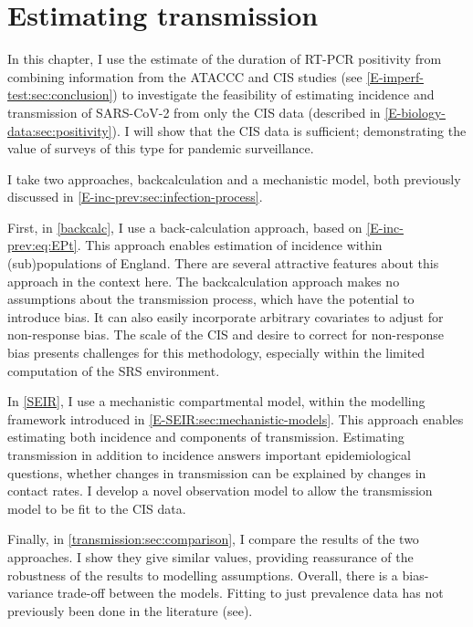 \documentclass[thesis.tex]{subfiles}
\begin{document}
\ifSubfilesClassLoaded{
    \setcounter{chapter}{6}
}

\chapter{Estimating transmission} \label{transmission}

In this chapter, I use the estimate of the duration of RT-PCR positivity from combining information from the ATACCC and CIS studies (see \cref{E-imperf-test:sec:conclusion}) to investigate the feasibility of estimating incidence and transmission of SARS-CoV-2 from only the CIS data (described in \cref{E-biology-data:sec:positivity}).
I will show that the CIS data is sufficient; demonstrating the value of surveys of this type for pandemic surveillance.

I take two approaches, backcalculation and a mechanistic model, both previously discussed in \cref{E-inc-prev:sec:infection-process}.

First, in \cref{backcalc}, I use a back-calculation approach, based on \cref{E-inc-prev:eq:EPt}.
This approach enables estimation of incidence within (sub)populations of England.
There are several attractive features about this approach in the context here.
The backcalculation approach makes no assumptions about the transmission process, which have the potential to introduce bias.
It can also easily incorporate arbitrary covariates to adjust for non-response bias.
The scale of the CIS and desire to correct for non-response bias presents challenges for this methodology, especially within the limited computation of the SRS environment.

In \cref{SEIR}, I use a mechanistic compartmental model, within the modelling framework introduced in \cref{E-SEIR:sec:mechanistic-models}.
This approach enables estimating both incidence and components of transmission.
Estimating transmission in addition to incidence answers important epidemiological questions, \eg whether changes in transmission can be explained by changes in contact rates.
I develop a novel observation model to allow the transmission model to be fit to the CIS data.

Finally, in \cref{transmission:sec:comparison}, I compare the results of the two approaches.
I show they give similar values, providing reassurance of the robustness of the results to modelling assumptions.
Overall, there is a bias-variance trade-off between the models.
Fitting to just prevalence data has not previously been done in the literature (see).
\end{document}
